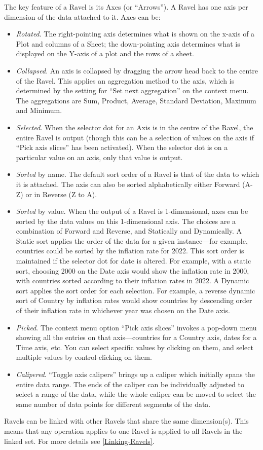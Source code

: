 The key feature of a Ravel is its Axes (or ``Arrows''). A Ravel
has one axis per dimension of the data attached to it. Axes can be:
\begin{itemize}
\item \emph{Rotated}. The right-pointing axis determines what is shown on
the x-axis of a Plot and columns of a Sheet; the down-pointing axis
determines what is displayed on the Y-axis of a plot and the rows
of a sheet.
\item \emph{Collapsed}. An axis is collapsed by dragging the arrow head
back to the centre of the Ravel. This applies an aggregation method
to the axis, which is determined by the setting for ``Set next aggregation''
on the context menu. The aggregations are Sum, Product, Average, Standard
Deviation, Maximum and Minimum.
\item \emph{Selected}. When the selector dot for an Axis is in the centre
of the Ravel, the entire Ravel is output (though this can be a selection
of values on the axis if ``Pick axis slices'' has been activated).
When the selector dot is on a particular value on an axis, only that
value is output.
\item \emph{Sorted }by name. The default sort order of a Ravel is that of
the data to which it is attached. The axis can also be sorted alphabetically
either Forward (A-Z) or in Reverse (Z to A).
\item \emph{Sorted }by value. When the output of a Ravel is 1-dimensional,
axes can be sorted by the data values on this 1-dimensional axis.
The choices are a combination of Forward and Reverse, and Statically
and Dynamically. A Static sort applies the order of the data for a
given instance---for example, countries could be sorted by the inflation
rate for 2022. This sort order is maintained if the selector dot for
date is altered. For example, with a static sort, choosing 2000 on
the Date axis would show the inflation rate in 2000, with countries
sorted according to their inflation rates in 2022. A Dynamic sort
applies the sort order for each selection. For example, a reverse
dynamic sort of Country by inflation rates would show countries by
descending order of their inflation rate in whichever year was chosen
on the Date axis.
\item \emph{Picked}. The context menu option ``Pick axis slices'' invokes
a pop-down menu showing all the entries on that axis---countries
for a Country axis, dates for a Time axis, etc. You can select specific
values by clicking on them, and select multiple values by control-clicking
on them.
\item \emph{Calipered}. ``Toggle axis calipers'' brings up a caliper which
initially spans the entire data range. The ends of the caliper can
be individually adjusted to select a range of the data, while the
whole caliper can be moved to select the same number of data points
for different segments of the data.
\end{itemize}
Ravels can be linked with other Ravels that share the same dimension(s).
This means that any operation applies to one Ravel is applied to all
Ravels in the linked set. For more details see \ref{Linking-Ravels}.

